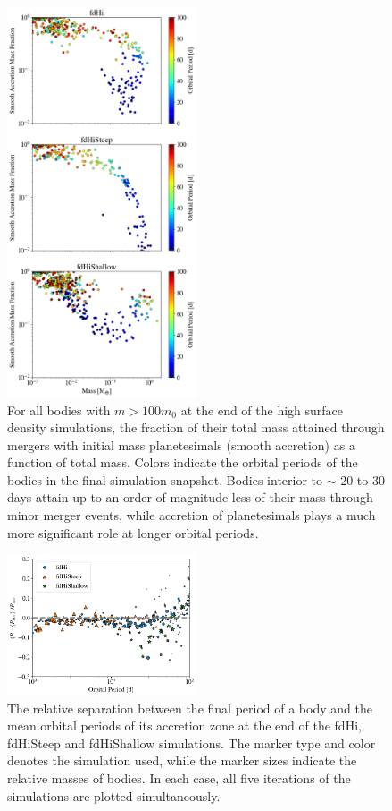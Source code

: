 \begin{figure}
\begin{center}
    \includegraphics[width=0.5\textwidth]{figures/plStip/minor_frac.png}
    \caption{For all bodies with $m > 100 m_{0}$ at the end of the high surface density simulations, the fraction of their total mass attained through mergers with initial mass planetesimals (smooth accretion) as a function of total mass. Colors indicate the orbital periods of the bodies in the final simulation snapshot. Bodies interior to $\sim$ 20 to 30 days attain up to an order of magnitude less of their mass through minor merger events, while accretion of planetesimals plays a much more significant role at longer orbital periods.\label{fig:minor_frac}}
\end{center}
\end{figure}

\begin{figure}
\begin{center}
    \includegraphics[width=0.5\textwidth]{figures/plStip/acc_zones.png}
    \caption{The relative separation between the final period
        of a body and the mean orbital periods of its accretion zone at the end of the fdHi, fdHiSteep and fdHiShallow simulations. The marker type and color denotes the simulation used, while the marker sizes indicate the relative masses of bodies. In each case, all five iterations of the simulations are plotted simultaneously.\label{fig:acc_zones}}
\end{center}
\end{figure}

